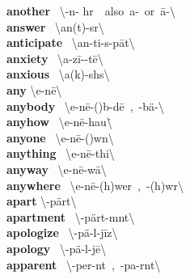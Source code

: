 \documentclass[10pt,a4paper]{article}
\begin{document}
\begin{multicols}{2}
\textbf{ another }\quad \ \textbackslash \textschwa -\textprimstress n\textschwa - h\textschwa r\ \ also\ a-\ or\ \={a}-\textbackslash \\
\textbf{ answer }\quad \ \textbackslash \textprimstress an(t)-s\textschwa r\textbackslash \\
\textbf{ anticipate }\quad \ \textbackslash an-\textprimstress ti-s\textschwa -\textsecstress p\={a}t\textbackslash \\
\textbf{ anxiety }\quad \ \textbackslash a\engma -\textprimstress z\={i}-\textschwa -t\={e}\textbackslash \\
\textbf{ anxious }\quad \ \textbackslash \textprimstress a\engma (k)-sh\textschwa s\textbackslash \\
\textbf{ any }\quad \textbackslash \textprimstress e-n\={e}\textbackslash \\
\textbf{ anybody }\quad \ \textbackslash \textprimstress e-n\={e}-(\textsecstress )b\textschwa -d\={e}\ ,\ -\textsecstress b\"{a}-\textbackslash \\
\textbf{ anyhow }\quad \ \textbackslash \textprimstress e-n\={e}-\textsecstress hau\. \textbackslash \\
\textbf{ anyone }\quad \ \textbackslash \textprimstress e-n\={e}-(\textsecstress )w\textschwa n\textbackslash \\
\textbf{ anything }\quad \ \textbackslash \textprimstress e-n\={e}-\textsecstress thi\engma \textbackslash \\
\textbf{ anyway }\quad \ \textbackslash \textprimstress e-n\={e}-\textsecstress w\={a}\textbackslash \\
\textbf{ anywhere }\quad \ \textbackslash \textprimstress e-n\={e}-\textsecstress (h)wer\ ,\ -(h)w\textschwa r\textbackslash \\
\textbf{ apart }\quad \textbackslash \textschwa -\textprimstress p\"{a}rt\textbackslash \\
\textbf{ apartment }\quad \ \textbackslash \textschwa -\textprimstress p\"{a}rt-m\textschwa nt\textbackslash \\
\textbf{ apologize }\quad \ \textbackslash \textschwa -\textprimstress p\"{a}-l\textschwa -\textsecstress j\={i}z\textbackslash \\
\textbf{ apology }\quad \ \textbackslash \textschwa -\textprimstress p\"{a}-l\textschwa -j\={e}\textbackslash \\
\textbf{ apparent }\quad \ \textbackslash \textschwa -\textprimstress per-\textschwa nt\ ,\ -\textprimstress pa-r\textschwa nt\textbackslash \\

\end{multicols}
\end{document}
